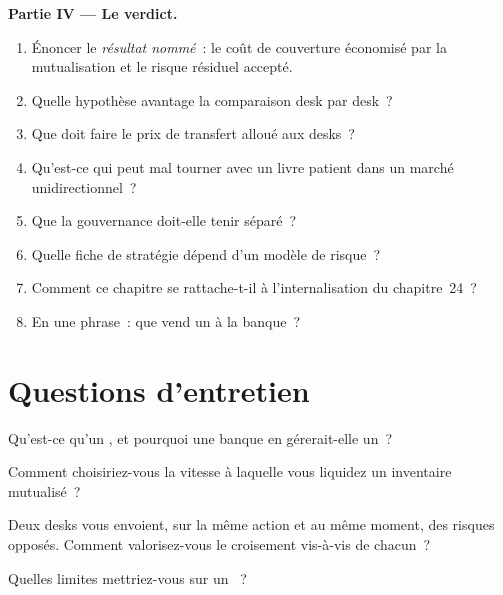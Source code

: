 \begin{problem}
\medskip\noindent\textbf{Partie IV --- Le verdict.}
\begin{enumerate}[resume]
\item Énoncer le \emph{résultat nommé}~: le coût de couverture économisé par la mutualisation et le risque résiduel accepté.
\item Quelle hypothèse avantage la comparaison desk par desk~?
\item Que doit faire le prix de transfert alloué aux desks~?
\item Qu'est-ce qui peut mal tourner avec un livre patient dans un marché unidirectionnel~?
\item Que la gouvernance doit-elle tenir séparé~?
\item Quelle fiche de stratégie dépend d'un modèle de risque~?
\item Comment ce chapitre se rattache-t-il à l'internalisation du chapitre~24~?
\item En une phrase~: que vend un  à la banque~?
\end{enumerate}
\end{problem}

\section{Questions d'entretien}

\begin{interviewq}\label{iq:s2:the-central-risk-book:1}
Qu'est-ce qu'un , et pourquoi une banque en gérerait-elle un~?
\end{interviewq}

\begin{interviewq}\label{iq:s2:the-central-risk-book:2}
Comment choisiriez-vous la vitesse à laquelle vous liquidez un inventaire mutualisé~?
\end{interviewq}

\begin{interviewq}\label{iq:s2:the-central-risk-book:3}
Deux desks vous envoient, sur la même action et au même moment, des risques opposés. Comment valorisez-vous le croisement vis-à-vis de chacun~?
\end{interviewq}

\begin{interviewq}\label{iq:s2:the-central-risk-book:4}
Quelles limites mettriez-vous sur un ~?
\end{interviewq}

